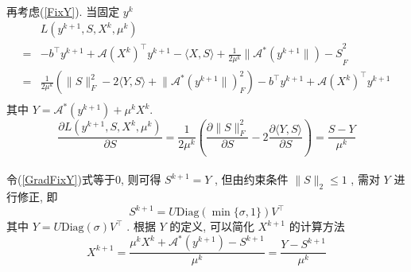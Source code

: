 \documentclass[UTF8]{ctexart}
\numberwithin{equation}{section}
\begin{document}
			\paragraph{}
				\quad 再考虑(\ref{FixY}). 当固定 $y^k$
				\begin{equation}
					\begin{split}\label{LagFixY}
							& L(y^{k + 1},S,X^k,\mu^k)\\
						=	& -b^\top y^{k + 1} + \mathcal{A}(X^k)^\top y^{k + 1} - \langle{X, S}\rangle + \frac{1}{2\mu^k} \lVert{\mathcal{A}^*(y^{k + 1}\rVert) - S}^2_F\\
						=	& \frac{1}{2\mu^k}(\lVert{S}\rVert_F^2 - 2\langle{Y, S}\rangle + \lVert{\mathcal{A}^*(y^{k + 1}\rVert)}_F^2) - b^\top y^{k + 1} + \mathcal{A}(X^k)^\top y^{k + 1}\\
					\end{split}
				\end{equation}
				其中 $Y = \mathcal{A}^*(y^{k + 1}) + \mu^k X^k$.
				\begin{equation}\label{GradFixY}
						\frac{\partial L(y^{k + 1},S,X^k,\mu^k)}{\partial S}
					=	\frac{1}{2\mu^k}(\frac{\partial \lVert{S}\rVert_F^2}{\partial S} - 2 \frac{\partial \langle{Y, S}\rangle}{\partial S})
					=	\frac{S - Y}{\mu^k}
				\end{equation}

			\paragraph{}
				\quad 令(\ref{GradFixY})式等于0, 则可得 $S^{k + 1} = Y$ , 但由约束条件 $\lVert{S}\rVert_2 \leq 1$ , 需对 $Y$ 进行修正, 即
				\begin{equation}\label{dualAS}
					S^{k + 1} = U \text{Diag}(\min \{\sigma, 1\}) V^\top
				\end{equation}
				其中 $Y = U \text{Diag}(\sigma) V^\top$ . 根据 $Y$ 的定义, 可以简化 $X^{k + 1}$ 的计算方法
				\begin{equation}\label{dualAX}
						X^{k + 1}
					=	\frac{\mu^kX^k + \mathcal{A}^*(y^{k + 1})-S^{k + 1}}{\mu^k}
					=	\frac{Y - S^{k + 1}}{\mu^k}
				\end{equation}
\end{document}
